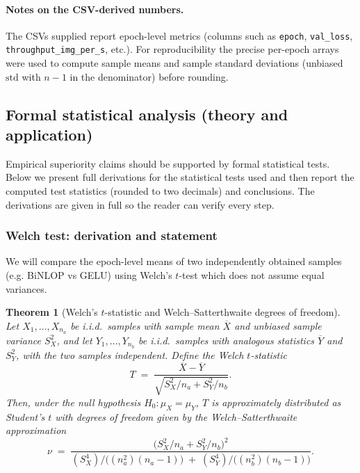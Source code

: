 \documentclass[11pt, twoside, openright, english]{article}
\numberwithin{equation}{section}
\theoremstyle{plain}
\newtheorem{theorem}{Theorem}[section]
\theoremstyle{definition}
\theoremstyle{remark}
\begin{document}
\paragraph{Notes on the CSV-derived numbers.} The CSVs supplied report epoch-level metrics (columns such as \texttt{epoch}, \texttt{val\_loss}, \texttt{throughput\_img\_per\_s}, etc.). For reproducibility the precise per-epoch arrays were used to compute sample means and sample standard deviations (unbiased $\mathrm{std}$ with $n-1$ in the denominator) before rounding.

\subsection{Formal statistical analysis (theory and application)}
Empirical superiority claims should be supported by formal statistical tests. Below we present full derivations for the statistical tests used and then report the computed test statistics (rounded to two decimals) and conclusions. The derivations are given in full so the reader can verify every step.

\subsubsection{Welch test: derivation and statement}
We will compare the epoch-level means of two independently obtained samples (e.g. BiNLOP vs GELU) using Welch's $t$-test which does not assume equal variances.

\begin{theorem}[Welch's $t$-statistic and Welch--Satterthwaite degrees of freedom]
Let $X_1,\dots,X_{n_a}$ be i.i.d.\ samples with sample mean $\overline X$ and unbiased sample variance $S_X^2$, and let $Y_1,\dots,Y_{n_b}$ be i.i.d.\ samples with analogous statistics $\overline Y$ and $S_Y^2$, with the two samples independent. Define the Welch $t$-statistic
\[
T \;=\; \frac{\overline X - \overline Y}{\sqrt{S_X^2/n_a + S_Y^2/n_b}}.
\]
Then, under the null hypothesis $H_0:\mu_X=\mu_Y$, $T$ is approximately distributed as Student's $t$ with degrees of freedom given by the Welch--Satterthwaite approximation
\[
\nu \;=\; \frac{\big(S_X^2/n_a + S_Y^2/n_b\big)^2}{ (S_X^4)/\big((n_a^2)(n_a-1)\big) \;+\; (S_Y^4)/\big((n_b^2)(n_b-1)\big)}.
\]
\end{theorem}
\end{document}
